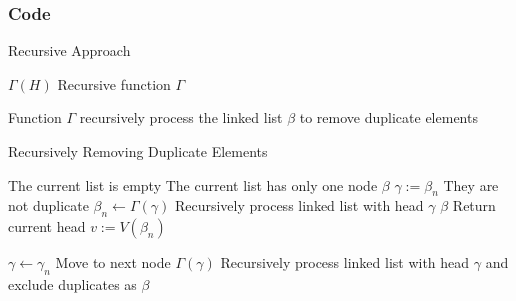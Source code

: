 \subsubsection{Code}
\begin{algorithm}[H]
\caption{Recursive Approach}
\begin{algorithmic}[1]
\State \Return $\Gamma(H)$ \Comment Recursive function $\Gamma$
\EndProcedure
\end{algorithmic}
\end{algorithm}

Function $\Gamma$ recursively process the linked list $\beta$ to remove duplicate elements
\begin{algorithm}[H]
\caption{Recursively Removing Duplicate Elements}
\begin{algorithmic}[1]
\Function{$\Gamma$}{$\beta$}
 \Comment The current list is empty
\State {}
\EndIf
{} \Comment The current list has only one node
\State \Return $\beta$
\EndIf
\State $\gamma:=\beta_n$
 \Comment They are not duplicate
\State $\beta_n \gets \Gamma(\gamma)$ \Comment Recursively process linked list with head $\gamma$
\State \Return $\beta$ \Comment Return current head
\EndIf
\State $v:=V(\beta_n)$
\end{algorithmic}
\end{algorithm}
\begin{algorithm}[H]
\begin{algorithmic}[1]
\State $\gamma \gets \gamma_n$ \Comment Move to next node
\EndWhile
\State \Return $\Gamma(\gamma)$ \Comment Recursively process linked list with head $\gamma$ and exclude duplicates as $\beta$
\EndFunction
\end{algorithmic}
\end{algorithm}